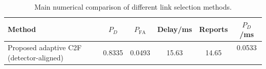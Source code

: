 \begin{table}[t]
    \centering
    \caption{Main numerical comparison of different link selection methods.}
    \label{tab:main_summary}
    \begin{tabular}{l c c c c c}
        \hline
        Method & $P_D$ & $P_{\mathrm{FA}}$ & Delay/ms & Reports & $P_D$/ms \\
        \hline
        Proposed adaptive C2F (detector-aligned) & 0.8335 & 0.0493 & 15.63 & 14.65 & 0.0533 \
        \hline
    \end{tabular}
\end{table}
